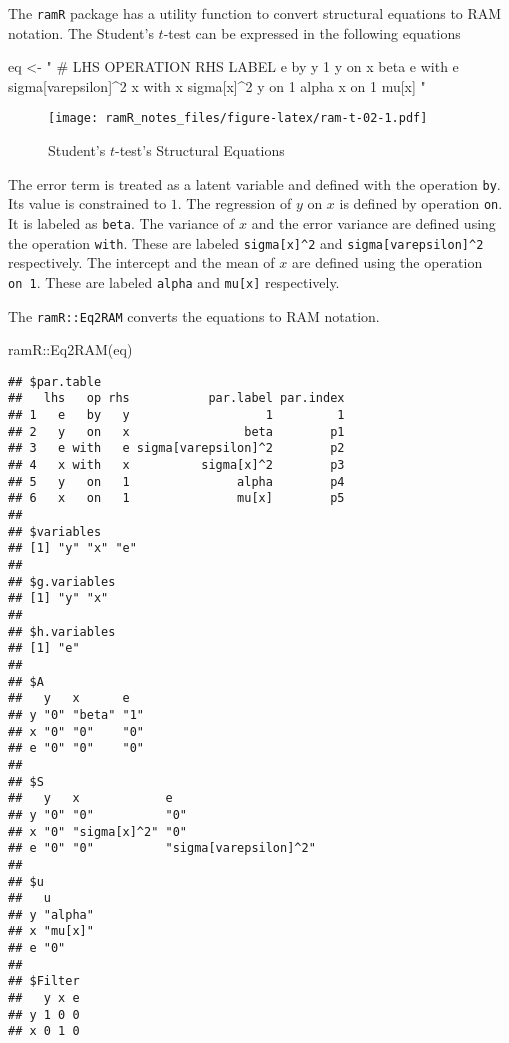 \documentclass[
]{book}
\newenvironment{Shaded}{\begin{snugshade}}{\end{snugshade}}
\newcommand{\FunctionTok}[1]{\textcolor[rgb]{0.00,0.00,0.00}{#1}}
\newcommand{\NormalTok}[1]{#1}
\newcommand{\OtherTok}[1]{\textcolor[rgb]{0.56,0.35,0.01}{#1}}
\newcommand{\SpecialCharTok}[1]{\textcolor[rgb]{0.00,0.00,0.00}{#1}}
\newcommand{\StringTok}[1]{\textcolor[rgb]{0.31,0.60,0.02}{#1}}
\theoremstyle{definition}
\theoremstyle{definition}
\theoremstyle{definition}
\theoremstyle{remark}
\begin{document}
The \texttt{ramR} package has a utility function
to convert structural equations to RAM notation.
The Student's \(t\)-test can be expressed in the following equations

\begin{Shaded}
\begin{Highlighting}[]
\NormalTok{eq }\OtherTok{\textless{}{-}} \StringTok{"}
\StringTok{  \# LHS OPERATION RHS LABEL}
\StringTok{  e     by        y   1}
\StringTok{  y     on        x   beta}
\StringTok{  e     with      e   sigma[varepsilon]\^{}2}
\StringTok{  x     with      x   sigma[x]\^{}2}
\StringTok{  y     on        1   alpha}
\StringTok{  x     on        1   mu[x]}
\StringTok{"}
\end{Highlighting}
\end{Shaded}

\begin{figure}
\centering
\texttt{[image: ramR\_notes\_files/figure-latex/ram-t-02-1.pdf]}
\caption{\label{fig:ram-t-02}Student's \(t\)-test's Structural Equations}
\end{figure}

The error term is treated as a latent variable
and defined with the operation \texttt{by}.
Its value is constrained to \(1\).
The regression of \(y\) on \(x\) is defined by operation \texttt{on}.
It is labeled as \texttt{beta}.
The variance of \(x\) and the error variance
are defined using the operation \texttt{with}.
These are labeled \texttt{sigma{[}x{]}\^{}2} and \texttt{sigma{[}varepsilon{]}\^{}2} respectively.
The intercept and the mean of \(x\) are defined using the operation \texttt{on\ 1}.
These are labeled \texttt{alpha} and \texttt{mu{[}x{]}} respectively.

The \texttt{ramR::Eq2RAM} converts the equations to RAM notation.

\begin{Shaded}
\begin{Highlighting}[]
\NormalTok{ramR}\SpecialCharTok{::}\FunctionTok{Eq2RAM}\NormalTok{(eq)}
\end{Highlighting}
\end{Shaded}

\begin{verbatim}
## $par.table
##   lhs   op rhs           par.label par.index
## 1   e   by   y                   1         1
## 2   y   on   x                beta        p1
## 3   e with   e sigma[varepsilon]^2        p2
## 4   x with   x          sigma[x]^2        p3
## 5   y   on   1               alpha        p4
## 6   x   on   1               mu[x]        p5
## 
## $variables
## [1] "y" "x" "e"
## 
## $g.variables
## [1] "y" "x"
## 
## $h.variables
## [1] "e"
## 
## $A
##   y   x      e  
## y "0" "beta" "1"
## x "0" "0"    "0"
## e "0" "0"    "0"
## 
## $S
##   y   x            e                    
## y "0" "0"          "0"                  
## x "0" "sigma[x]^2" "0"                  
## e "0" "0"          "sigma[varepsilon]^2"
## 
## $u
##   u      
## y "alpha"
## x "mu[x]"
## e "0"    
## 
## $Filter
##   y x e
## y 1 0 0
## x 0 1 0
\end{verbatim}
\end{document}
